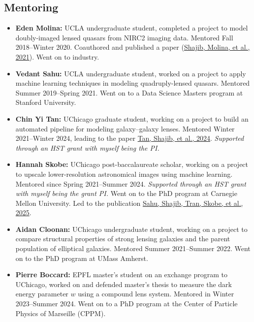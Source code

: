 \documentclass[margin, line]{res}
\begin{document}
\begin{resume}
\section{\sc Mentoring}
\begin{itemize}
	\item \textbf{Eden Molina:} UCLA undergraduate student, completed a project to model doubly-imaged lensed quasars from NIRC2 imaging data. Mentored Fall 2018--Winter 2020. Coauthored and published a paper (\href{https://doi:10.1093/mnras/stab532}{Shajib, Molina, et al., 2021}). Went on to industry.
	\item \textbf{Vedant Sahu:} UCLA undergraduate student, worked on a project to apply machine learning techniques in modeling quadruply-lensed quasars. Mentored Summer 2019--Spring 2021. Went on to a Data Science Masters program at Stanford University.
	\item \textbf{Chin Yi Tan:} UChicago graduate student, working on a project to build an automated pipeline for modeling galaxy--galaxy lenses. Mentored Winter 2021--Winter 2024, leading to the paper \href{https://ui.adsabs.harvard.edu/abs/2023arXiv231109307T/abstract}{Tan, Shajib, et al., 2024}. \textit{Supported through an \textsc{HST} grant with myself being the PI.}
	\item \textbf{Hannah Skobe:} UChicago post-baccalaureate scholar, working on a project to upscale lower-resolution astronomical images using machine learning. Mentored since Spring 2021--Summer 2024. \textit{Supported through an HST grant with myself being the grant PI.} Went on to the PhD program at Carnegie Mellon University. Led to the publication \href{https://ui.adsabs.harvard.edu/abs/2025arXiv250400656S/abstract}{Sahu, Shajib, Tran, Skobe, et al., 2025}.
	\item \textbf{Aidan Cloonan:} UChicago undergraduate student, working on a project to compare structural properties of strong lensing galaxies and the parent population of elliptical galaxies. Mentored Summer 2021--Summer 2022. Went on to the PhD program at UMass Amherst.
	\item \textbf{Pierre Boccard:} EPFL master's student on an exchange program to UChicago, worked on and defended master's thesis to measure the dark energy parameter $w$ using a compound lens system. Mentored in Winter 2023--Summer 2024. Went on to a PhD program at the Center of Particle Physics of Marseille (CPPM).

\end{itemize}
\end{resume}
\end{document}
